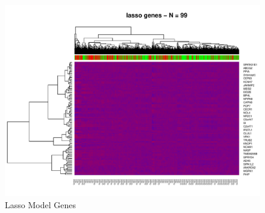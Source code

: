 \documentclass[
]{book}
\begin{document}
\begin{figure}
\centering
\includegraphics{Static/figures/heatmapLasso-1.pdf}
\caption{\label{fig:heatmapLasso}Lasso Model Genes}
\end{figure}
\end{document}
